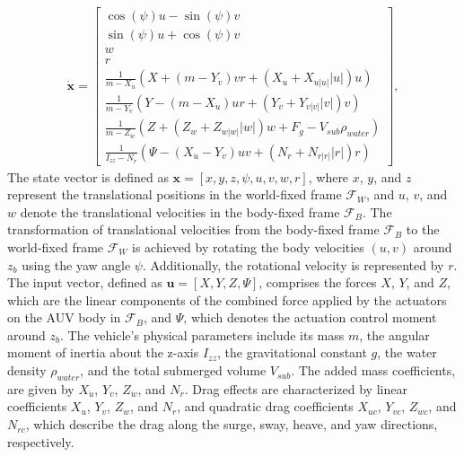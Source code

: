 \documentclass[conference]{IEEEtran}
\begin{document}
\begin{equation}
    \label{eq:rov_simplified}
    \begin{aligned}
        \dot{\mathbf{x}} = \begin{bmatrix}
        \cos(\psi)u-\sin(\psi)v \\ 
        \sin(\psi)u+\cos(\psi)v \\ 
        w \\ 
        r \\ 
        \frac{1}{m-X_{\dot{u}}}\left(X + (m-Y_{\dot{v}})vr+(X_u+X_{u|u|}|u|)u\right) \\ 
        \frac{1}{m-Y_{\dot{v}}}\left(Y - (m-X_{\dot{u}})ur+(Y_v+Y_{v|v|}|v|)v\right) \\ 
        \frac{1}{m-Z_{\dot{w}}}\left(Z + (Z_w+Z_{w|w|}|w|)w+F_g-V_{sub } \rho_{water}\right) \\ 
        \frac{1}{I_{zz}-N_{\dot{r}}}\left(\Psi - (X_{\dot{u}}-Y_{\dot{v}})uv+(N_r+N_{r|r|}|r|)r\right) 
    \end{bmatrix},
    \end{aligned}
\end{equation}
The state vector is defined as $\mathbf{x} = [x, y, z, \psi, u, v, w, r]$, where $x$, $y$, and $z$ represent the translational positions in the world-fixed frame $\mathcal{F}_W$, and $u$, $v$, and $w$ denote the translational velocities in the body-fixed frame $\mathcal{F}_B$. The transformation of translational velocities from the body-fixed frame $\mathcal{F}_B$ to the world-fixed frame $\mathcal{F}_W$ is achieved by rotating the body velocities $(u, v)$ around $z_b$ using the yaw angle $\psi$. Additionally, the rotational velocity is represented by $r$. The input vector, defined as $\mathbf{u} = [X, Y, Z, \Psi]$, comprises the forces $X$, $Y$, and $Z$, which are the linear components of the combined force applied by the actuators on the AUV body in $\mathcal{F}_B$, and $\Psi$, which denotes the actuation control moment around $z_b$. 
The vehicle’s physical parameters include its mass $m$, the angular moment of inertia about the z-axis $I_{zz}$, the gravitational constant $g$, the water density $\rho_{water}$, and the total submerged volume $V_{sub}$. The added mass coefficients, are given by $X_{\dot{u}}$, $Y_{\dot{v}}$, $Z_{\dot{w}}$, and $N_{\dot{r}}$. Drag effects are characterized by linear coefficients $X_{u}$, $Y_{v}$, $Z_{w}$, and $N_{r}$, and quadratic drag coefficients $X_{uc}$, $Y_{vc}$, $Z_{wc}$, and $N_{rc}$, which describe the drag along the surge, sway, heave, and yaw directions, respectively.
\end{document}
